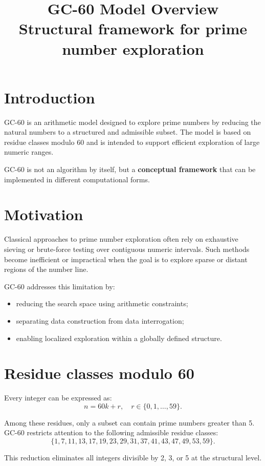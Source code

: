 \documentclass[11pt,a4paper]{article}
\title{\textbf{GC-60 Model Overview}\\
\large Structural framework for prime number exploration}
\author{}
\date{}
\begin{document}
\maketitle

\section*{Introduction}

GC-60 is an arithmetic model designed to explore prime numbers by reducing the natural numbers to a structured and admissible subset.
The model is based on residue classes modulo 60 and is intended to support efficient exploration of large numeric ranges.

GC-60 is not an algorithm by itself, but a \textbf{conceptual framework} that can be implemented in different computational forms.

\section*{Motivation}

Classical approaches to prime number exploration often rely on exhaustive sieving or brute-force testing over contiguous numeric intervals.
Such methods become inefficient or impractical when the goal is to explore sparse or distant regions of the number line.

GC-60 addresses this limitation by:
\begin{itemize}[leftmargin=1.5cm]
\item reducing the search space using arithmetic constraints;
\item separating data construction from data interrogation;
\item enabling localized exploration within a globally defined structure.
\end{itemize}

\section*{Residue classes modulo 60}

Every integer can be expressed as:
\[
n = 60k + r, \quad r \in \{0,1,\dots,59\}.
\]

Among these residues, only a subset can contain prime numbers greater than 5.
GC-60 restricts attention to the following admissible residue classes:
\[
\{1,7,11,13,17,19,23,29,31,37,41,43,47,49,53,59\}.
\]

This reduction eliminates all integers divisible by 2, 3, or 5 at the structural level.
\end{document}
